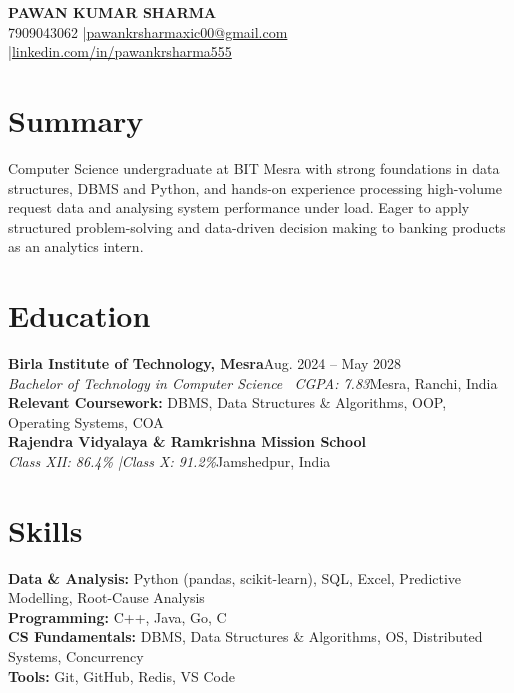 \documentclass[a4paper,11pt]{article}
\newcommand{\entry}[4]{\textbf{#1}\hfill #2\\\textit{#3}\hfill {\small #4}\vspace{-2pt}}
\begin{document}
\begin{center}
{\fontsize{24}{28}\selectfont\bfseries PAWAN KUMAR SHARMA}\\[4pt]
7909043062 \enspace|\enspace \href{mailto:pawankrsharmaxic00@gmail.com}{pawankrsharmaxic00@gmail.com} \enspace|\enspace \href{https://linkedin.com/in/pawankrsharma555}{linkedin.com/in/pawankrsharma555}
\end{center}

\section{Summary}
Computer Science undergraduate at BIT Mesra with strong foundations in data structures, DBMS and Python, and hands-on experience processing high-volume request data and analysing system performance under load. Eager to apply structured problem-solving and data-driven decision making to banking products as an analytics intern.

\section{Education}
\entry{Birla Institute of Technology, Mesra}{Aug. 2024 -- May 2028}{Bachelor of Technology in Computer Science \textbar\ CGPA: 7.83}{Mesra, Ranchi, India}\\[2pt]
\textbf{Relevant Coursework:} DBMS, Data Structures \& Algorithms, OOP, Operating Systems, COA\\[4pt]
\entry{Rajendra Vidyalaya \& Ramkrishna Mission School}{}{Class XII: 86.4\% \enspace|\enspace Class X: 91.2\%}{Jamshedpur, India}

\section{Skills}
\textbf{Data \& Analysis:} Python (pandas, scikit-learn), SQL, Excel, Predictive Modelling, Root-Cause Analysis\\
\textbf{Programming:} C++, Java, Go, C\\
\textbf{CS Fundamentals:} DBMS, Data Structures \& Algorithms, OS, Distributed Systems, Concurrency\\
\textbf{Tools:} Git, GitHub, Redis, VS Code
\end{document}
